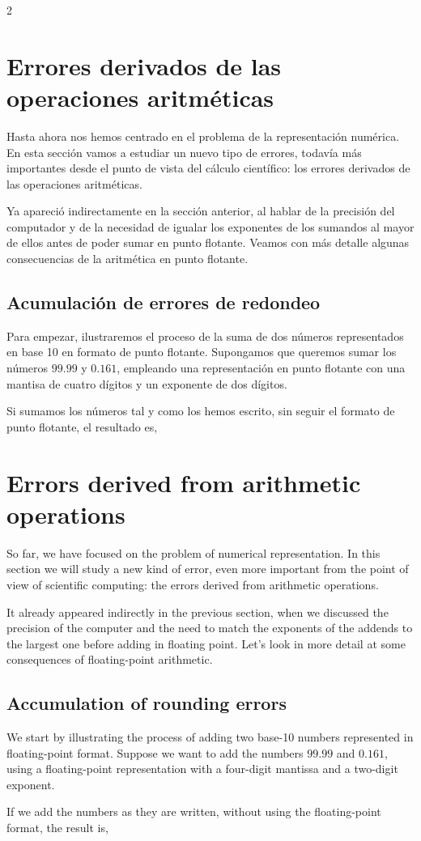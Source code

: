 \begin{paracol}{2}
\section{Errores derivados de las operaciones aritméticas}
Hasta ahora nos hemos centrado en el problema de la representación numérica. En esta sección vamos a estudiar un nuevo tipo de errores, todavía más importantes desde el punto de vista del cálculo científico: los errores derivados de las operaciones aritméticas.

Ya apareció indirectamente en la sección anterior, al hablar de la precisión del computador y de la necesidad de igualar los exponentes de los sumandos al mayor de ellos antes de poder sumar en punto flotante. Veamos con más detalle algunas consecuencias de la aritmética en punto flotante.
\subsection{Acumulación de errores de redondeo}

Para empezar, ilustraremos el proceso de la suma de dos números representados en base 10 en formato de punto flotante. Supongamos que queremos sumar los números $99.99$ y $0.161$, empleando una representación en punto flotante con una mantisa de cuatro dígitos y un exponente de dos dígitos.

Si sumamos los números tal y como los hemos escrito, sin seguir el formato de punto flotante, el resultado es,
\switchcolumn
\section{Errors derived from arithmetic operations}
So far, we have focused on the problem of numerical representation. In this section we will study a new kind of error, even more important from the point of view of scientific computing: the errors derived from arithmetic operations.

It already appeared indirectly in the previous section, when we discussed the precision of the computer and the need to match the exponents of the addends to the largest one before adding in floating point. Let's look in more detail at some consequences of floating-point arithmetic.
\subsection{Accumulation of rounding errors} 
We start by illustrating the process of adding two base-10 numbers represented in floating-point format. Suppose we want to add the numbers $99.99$ and $0.161$, using a floating-point representation with a four-digit mantissa and a two-digit exponent.

If we add the numbers as they are written, without using the floating-point format, the result is,
\end{paracol}
